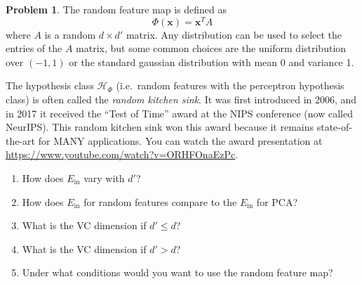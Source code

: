 \documentclass[10pt]{exam}
\theoremstyle{definition}
\newtheorem{problem}{Problem}
\newcommand{\Ein}{E_{\text{in}}}
\newcommand{\trans}[1]{{#1}^{T}}
\newcommand{\x}{\mathbf x}
\newcommand{\HH}[1]{\mathcal H_{\text{#1}}}
\begin{document}
\begin{problem}
    The random feature map is defined as 
    \begin{equation}
        \Phi(\x) = \trans\x A
    \end{equation}
    where $A$ is a random $d\times d'$ matrix.
    Any distribution can be used to select the entries of the $A$ matrix, but some common choices are the uniform distribution over $(-1,1)$ or the standard gaussian distribution with mean 0 and variance 1.

    The hypothesis class $\HH{$\Phi$}$ (i.e.\ random features with the perceptron hypothesis class) is often called the \emph{random kitchen sink}.
    It was first introduced in 2006, and in 2017 it received the ``Test of Time'' award at the NIPS conference (now called NeurIPS).
    This random kitchen sink won this award because it remains state-of-the-art for MANY applications.
    You can watch the award presentation at \url{https://www.youtube.com/watch?v=ORHFOnaEzPc}. %

    \begin{enumerate}
        \item
            How does $\Ein$ vary with $d'$?
            \vspace{3in}

        \item
            How does $\Ein$ for random features compare to the $\Ein$ for PCA?
            \vspace{3in}

            \newpage
        \item
            What is the VC dimension if $d' \le d$?
            \vspace{3in}

        \item
            What is the VC dimension if $d' > d$?
            \vspace{3in}

        \item
            Under what conditions would you want to use the random feature map?
    \end{enumerate}
\end{problem}
\end{document}
